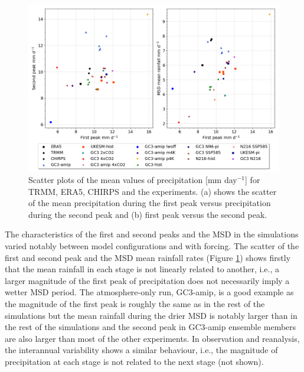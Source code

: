  
 
\label{sq:msdclim}
 \begin{figure}[t!]
\includegraphics[width=\linewidth]{figures/dumscatter_2.png}
\caption{Scatter plots of the mean values of precipitation [mm day$^{-1}$] for TRMM, ERA5, CHIRPS and the experiments. (a) shows the scatter of the mean precipitation during the first peak versus precipitation during the second peak and (b) first peak versus the second peak.  }
\label{fig:scatter_msd}
\end{figure} 

The characteristics of the first and second peaks and the MSD in the simulations varied notably between model configurations and with forcing. The scatter of the first and second peak and the MSD mean rainfall rates (Figure \ref{fig:scatter_msd}) shows firstly that the mean rainfall in each stage is not linearly related to another, i.e., a larger magnitude of the first peak of precipitation does not necessarily imply a wetter MSD period. The atmosphere-only run, GC3-amip, is a good example as the magnitude of the first peak is roughly the same as in the rest of the simulations but the mean rainfall during the drier MSD is notably larger than in the rest of the simulations and the second peak in GC3-amip ensemble members are also larger than most of the other experiments. In observation and reanalysis, the interannual variability shows a similar behaviour, i.e., the magnitude of precipitation at each stage is not related to the next stage (not shown). 

